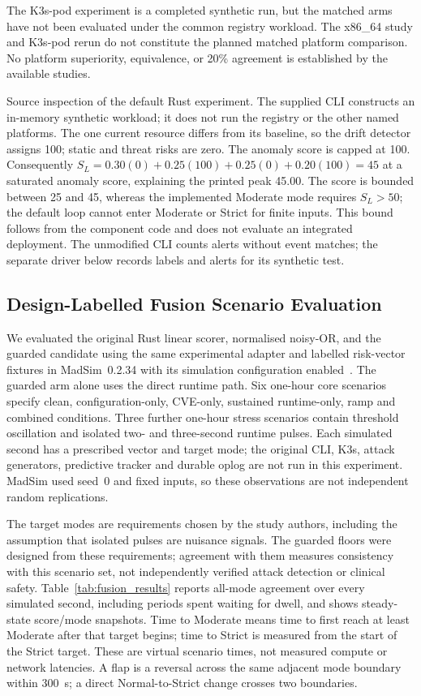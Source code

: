 \documentclass{ieeeaccess}
\renewcommand{\textbf}[1]{#1}
\begin{document}
The K3s-pod experiment is a completed synthetic run, but the matched arms have not been evaluated under the common registry workload. The x86\_64 study and K3s-pod rerun do not constitute the planned matched platform comparison. No platform superiority, equivalence, or 20\% agreement is established by the available studies.

\noindent\textbf{Source inspection of the default Rust experiment.} The supplied CLI constructs an in-memory synthetic workload; it does not run the registry or the other named platforms. The one current resource differs from its baseline, so the drift detector assigns 100; static and threat risks are zero. The anomaly score is capped at 100. Consequently $S_L=0.30(0)+0.25(100)+0.25(0)+0.20(100)=45$ at a saturated anomaly score, explaining the printed peak 45.00. The score is bounded between 25 and 45, whereas the implemented Moderate mode requires $S_L>50$; the default loop cannot enter Moderate or Strict for finite inputs. This bound follows from the component code and does not evaluate an integrated deployment. The unmodified CLI counts alerts without event matches; the separate driver below records labels and alerts for its synthetic test.

\subsection{Design-Labelled Fusion Scenario Evaluation}
\label{subsec:fusion_eval}

We evaluated the original Rust linear scorer, normalised noisy-OR, and the guarded candidate using the same experimental adapter and labelled risk-vector fixtures in MadSim~0.2.34 with its simulation configuration enabled~\cite{b_madsim}. The guarded arm alone uses the direct runtime path. Six one-hour core scenarios specify clean, configuration-only, CVE-only, sustained runtime-only, ramp and combined conditions. Three further one-hour stress scenarios contain threshold oscillation and isolated two- and three-second runtime pulses. Each simulated second has a prescribed vector and target mode; the original CLI, K3s, attack generators, predictive tracker and durable oplog are not run in this experiment. MadSim used seed~0 and fixed inputs, so these observations are not independent random replications.

The target modes are requirements chosen by the study authors, including the assumption that isolated pulses are nuisance signals. The guarded floors were designed from these requirements; agreement with them measures consistency with this scenario set, not independently verified attack detection or clinical safety. Table~\ref{tab:fusion_results} reports all-mode agreement over every simulated second, including periods spent waiting for dwell, and shows steady-state score/mode snapshots. Time to Moderate means time to first reach at least Moderate after that target begins; time to Strict is measured from the start of the Strict target. These are virtual scenario times, not measured compute or network latencies. A flap is a reversal across the same adjacent mode boundary within 300~s; a direct Normal-to-Strict change crosses two boundaries.
\end{document}
